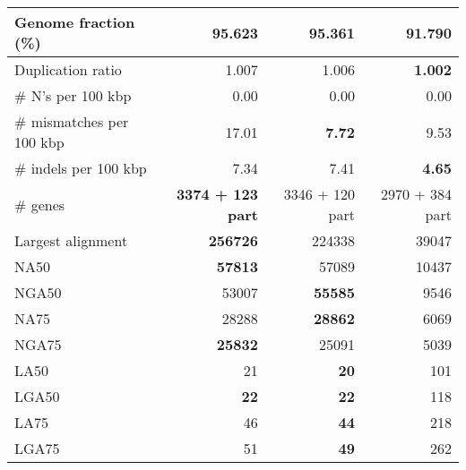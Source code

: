 \documentclass[12pt,a4paper]{article}
\begin{document}
\begin{table}[ht]
\begin{center}
\begin{tabular}{|l*{3}{|r}|}
Genome fraction (\%) & {\bf 95.623} & 95.361 & 91.790 \\ \hline
Duplication ratio & 1.007 & 1.006 & {\bf 1.002} \\ \hline
\# N's per 100 kbp & 0.00 & 0.00 & 0.00 \\ \hline
\# mismatches per 100 kbp & 17.01 & {\bf 7.72} & 9.53 \\ \hline
\# indels per 100 kbp & 7.34 & 7.41 & {\bf 4.65} \\ \hline
\# genes & {\bf 3374 + 123 part} & 3346 + 120 part & 2970 + 384 part \\ \hline
Largest alignment & {\bf 256726} & 224338 & 39047 \\ \hline
NA50 & {\bf 57813} & 57089 & 10437 \\ \hline
NGA50 & 53007 & {\bf 55585} & 9546 \\ \hline
NA75 & 28288 & {\bf 28862} & 6069 \\ \hline
NGA75 & {\bf 25832} & 25091 & 5039 \\ \hline
LA50 & 21 & {\bf 20} & 101 \\ \hline
LGA50 & {\bf 22} & {\bf 22} & 118 \\ \hline
LA75 & 46 & {\bf 44} & 218 \\ \hline
LGA75 & 51 & {\bf 49} & 262 \\ \hline
\end{tabular}
\end{center}
\end{table}
\end{document}
